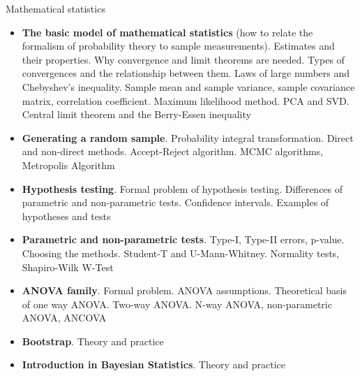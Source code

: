 \documentclass[fullscreen=true, bookmarks=true, hyperref={pdfencoding=unicode}]{beamer}
\begin{document}
\begin{frame}[t]
  Mathematical statistics
  {\scriptsize
  \begin{itemize}
    \item \textbf{The basic model of mathematical statistics} (how to relate the formalism of 
    probability theory to sample measurements). Estimates and their properties. 
    Why convergence and limit theorems are needed. Types of convergences and the relationship between them. 
    Laws of large numbers and Chebyshev's inequality. 
    Sample mean and sample variance, sample covariance matrix, correlation coefficient. 
    Maximum likelihood method. PCA and SVD. Central limit theorem and the Berry-Essen inequality
    \item \textbf{Generating a random sample}. Probability integral transformation. Direct and non-direct methods. 
    Accept-Reject algorithm. MCMC algorithms, Metropolis Algorithm
    \item \textbf{Hypothesis testing}. Formal problem of hypothesis testing. Differences of parametric and non-parametric 
    tests. Confidence intervals. Examples of hypotheses and tests 
    \item \textbf{Parametric and non-parametric tests}. Type-I, Type-II errors, p-value. Choosing the methods. Student-T and U-Mann-Whitney. 
    Normality tests, Shapiro-Wilk W-Test
    \item \textbf{ANOVA family}. Formal problem. ANOVA assumptions. Theoretical basis of one way ANOVA. Two-way ANOVA. 
    N-way ANOVA, non-parametric ANOVA, ANCOVA
    \item \textbf{Bootstrap}. Theory and practice
    \item \textbf{Introduction in Bayesian Statistics}. Theory and practice
  \end{itemize}
  }
\end{frame}
\end{document}
